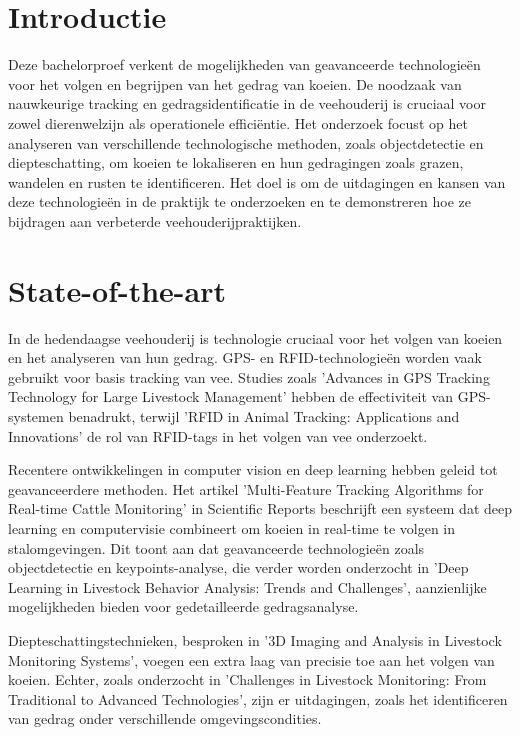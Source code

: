 
\section{Introductie}%
\label{sec:introductie}

Deze bachelorproef verkent de mogelijkheden van geavanceerde technologieën voor het volgen en begrijpen van het gedrag van koeien. De noodzaak van nauwkeurige tracking en gedragsidentificatie in de veehouderij is cruciaal voor zowel dierenwelzijn als operationele efficiëntie. Het onderzoek focust op het analyseren van verschillende technologische methoden, zoals objectdetectie en diepteschatting, om koeien te lokaliseren en hun gedragingen zoals grazen, wandelen en rusten te identificeren. Het doel is om de uitdagingen en kansen van deze technologieën in de praktijk te onderzoeken en te demonstreren hoe ze bijdragen aan verbeterde veehouderijpraktijken.


\section{State-of-the-art}%
\label{sec:state-of-the-art}

In de hedendaagse veehouderij is technologie cruciaal voor het volgen van koeien en het analyseren van hun gedrag. GPS- en RFID-technologieën worden vaak gebruikt voor basis tracking van vee. Studies zoals 'Advances in GPS Tracking Technology for Large Livestock Management' hebben de effectiviteit van GPS-systemen benadrukt, terwijl 'RFID in Animal Tracking: Applications and Innovations' de rol van RFID-tags in het volgen van vee onderzoekt.

Recentere ontwikkelingen in computer vision en deep learning hebben geleid tot geavanceerdere methoden. Het artikel 'Multi-Feature Tracking Algorithms for Real-time Cattle Monitoring' in Scientific Reports beschrijft een systeem dat deep learning en computervisie combineert om koeien in real-time te volgen in stalomgevingen. Dit toont aan dat geavanceerde technologieën zoals objectdetectie en keypoints-analyse, die verder worden onderzocht in 'Deep Learning in Livestock Behavior Analysis: Trends and Challenges', aanzienlijke mogelijkheden bieden voor gedetailleerde gedragsanalyse.

Diepteschattingstechnieken, besproken in '3D Imaging and Analysis in Livestock Monitoring Systems', voegen een extra laag van precisie toe aan het volgen van koeien. Echter, zoals onderzocht in 'Challenges in Livestock Monitoring: From Traditional to Advanced Technologies', zijn er uitdagingen, zoals het identificeren van gedrag onder verschillende omgevingscondities.

